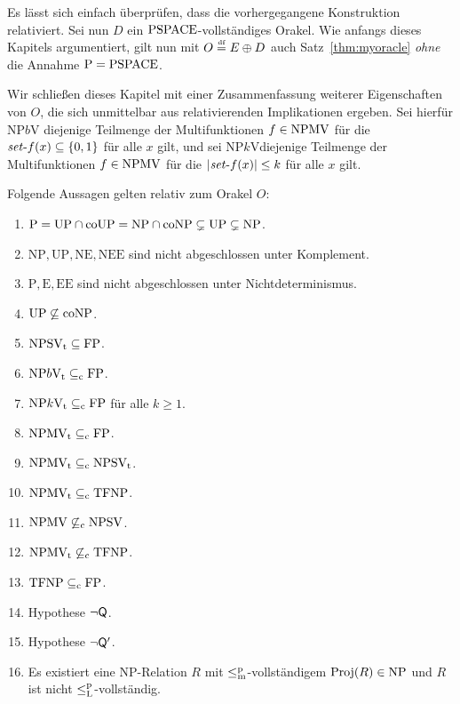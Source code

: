Es lässt sich einfach überprüfen, dass die vorhergegangene Konstruktion relativiert.
Sei nun $D$ ein $\mathrm{PSPACE}$-vollständiges Orakel.
Wie anfangs dieses Kapitels argumentiert, gilt nun mit $O\stackrel{\text{\smash{\tiny df}}}{=} E\oplus D$ auch Satz~\ref{thm:myoracle} \emph{ohne} die Annahme $\mathrm{P}=\mathrm{PSPACE}$.

Wir schließen dieses Kapitel mit einer Zusammenfassung weiterer Eigenschaften von $O$, die sich unmittelbar aus relativierenden Implikationen ergeben.
Sei hierfür $\mathrm{NP}b\mathrm{V}$ diejenige Teilmenge der Multifunktionen $f\in\mathrm{NPMV}$ für die $\mathit{set}\text{-}{f}(x)\subseteq\{0,1\}$ für alle $x$ gilt, 
und sei $\mathrm{NP}k\mathrm{V}$diejenige Teilmenge der Multifunktionen $f\in\mathrm{NPMV}$ für die $|\mathit{set}\text{-}{f}(x)|\leq k$ für alle $x$ gilt.
\begin{corollary}
    Folgende Aussagen gelten relativ zum Orakel $O$:
    \begin{enumerate}[noitemsep,midpenalty=0]\raggedright
        \item $\mathrm{P}=\mathrm{UP}\cap\mathrm{coUP}=\mathrm{NP}\cap\mathrm{coNP}\subsetneq \mathrm{UP} \subsetneq \mathrm{NP}$.
        \item $\mathrm{NP, UP, NE, NEE}$ sind nicht abgeschlossen unter Komplement. 
        \item $\mathrm{P, E, EE}$ sind nicht abgeschlossen unter Nichtdeterminismus.
        \item $\mathrm{UP}\not\subseteq \mathrm{coNP}$.
        \item $\mathrm{NPSV_t}\subseteq\mathrm{FP}$.
        \item $\mathrm{NP}b\mathrm{V_t} \subseteq_{\mathrm{c}}\mathrm{FP}$.
        \item $\mathrm{NP}k\mathrm{V_t} \subseteq_{\mathrm{c}}\mathrm{FP}$ für alle $k\geq 1$.
        \item $\mathrm{NPMV_t} \subseteq_{\mathrm{c}} \mathrm{FP}$.
        \item $\mathrm{NPMV_t} \subseteq_{\mathrm{c}} \mathrm{NPSV_t}$.
        \item $\mathrm{NPMV_t} \subseteq_{\mathrm{c}} \mathrm{TFNP}$.
        \item $\mathrm{NPMV} \not\subseteq_{\mathrm{c}} \mathrm{NPSV}$.
        \item $\mathrm{NPMV_t} \not\subseteq_{\mathrm{c}} \mathrm{TFNP}$.
        \item $\mathrm{TFNP}\subseteq_{\mathrm{c}} \mathrm{FP}$.
        \item Hypothese $\neg\mathsf{Q}$.
        \item Hypothese $\neg\mathsf{Q}'$.
        \item Es existiert eine NP-Relation $R$ mit $\leq_\mathrm{m}^\mathrm{p}$-vollständigem $\operatorname{Proj}(R)\in\mathrm{NP}$ und $R$ ist nicht $\leq_\mathrm{L}^\mathrm{p}$-vollständig.

\end{enumerate}
\end{corollary}
